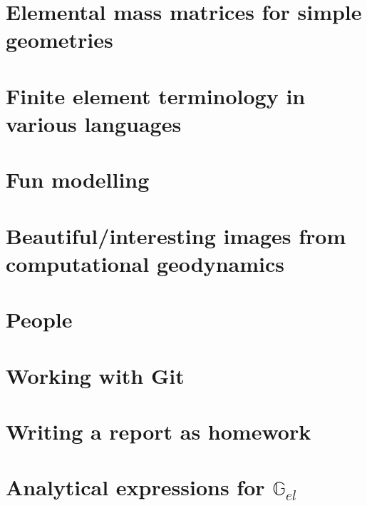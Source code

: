 \documentclass[a4paper]{article}
\numberwithin{equation}{section}
\newcommand{\G}{{\mathbb{G}}}
\begin{document}
\section{Elemental mass matrices for simple geometries}\label{app:mm} 
\newpage %
\section{Finite element terminology in various languages}  %
\newpage %
\section{Fun modelling}  %
\newpage %
\section{Beautiful/interesting images from computational geodynamics}%
\newpage %
\section{People}%
\newpage %
\section{Working with Git} %
\newpage %
\section{Writing a report as homework} %
\newpage %
\section{Analytical expressions for $\G_{el}$} \label{app:Gel} %
\newpage %
\end{document}
